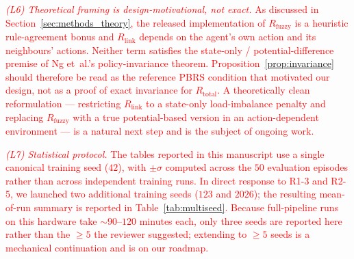 \documentclass[journal]{IEEEtran}
\newcommand{\rev}[1]{\textcolor{red}{#1}}
\begin{document}
\rev{\emph{(L6) Theoretical framing is design-motivational, not exact.} As discussed in Section~\ref{sec:methods_theory}, the released implementation of $R_{\text{fuzzy}}$ is a heuristic rule-agreement bonus and $R_{\text{link}}$ depends on the agent's own action and its neighbours' actions. Neither term satisfies the state-only / potential-difference premise of Ng et~al.'s policy-invariance theorem. Proposition~\ref{prop:invariance} should therefore be read as the reference PBRS condition that motivated our design, not as a proof of exact invariance for $R_{\text{total}}$. A theoretically clean reformulation --- restricting $R_{\text{link}}$ to a state-only load-imbalance penalty and replacing $R_{\text{fuzzy}}$ with a true potential-based version in an action-dependent environment --- is a natural next step and is the subject of ongoing work.}

\rev{\emph{(L7) Statistical protocol.} The tables reported in this manuscript use a single canonical training seed ($42$), with $\pm\sigma$ computed across the $50$ evaluation episodes rather than across independent training runs. In direct response to R1-3 and R2-5, we launched two additional training seeds ($123$ and $2026$); the resulting mean-of-run summary is reported in Table~\ref{tab:multiseed}. Because full-pipeline runs on this hardware take $\sim 90$--$120$ minutes each, only three seeds are reported here rather than the $\geq 5$ the reviewer suggested; extending to $\geq 5$ seeds is a mechanical continuation and is on our roadmap.}
\end{document}
